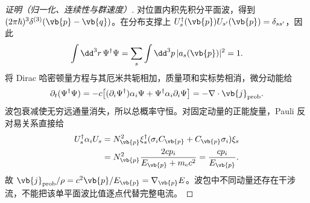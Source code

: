 \begin{proof}[证明（归一化、连续性与群速度）]
对位置内积先积分平面波，得到 $(2\pi\hbar)^3\delta^{(3)}(\vb{p}-\vb{q})$。在分布支撑上 $U_s^\dagger(\vb{p})U_{s'}(\vb{p})=\delta_{ss'}$，因此
\begin{equation*}
 \int\dd^3r\,\Psi^\dagger\Psi
 =\sum_s\int\dd^3p\,|a_s(\vb{p})|^2=1.
\end{equation*}
将 Dirac 哈密顿量方程与其厄米共轭相加，质量项和实标势相消，微分动能给
\begin{equation*}
 \partial_t(\Psi^\dagger\Psi)
 =-c\big[(\partial_i\Psi^\dagger)\alpha_i\Psi
 +\Psi^\dagger\alpha_i\partial_i\Psi\big]
 =-\nabla\cdot\vb{j}_{\rm prob}.
\end{equation*}
波包衰减使无穷远通量消失，所以总概率守恒。对固定动量的正能旋量，Pauli 反对易关系直接给
\begin{align*}
 U_s^\dagger\alpha_iU_s
 &=N_{\vb{p}}^2\xi_s^\dagger(\sigma_iC_{\vb{p}}+C_{\vb{p}}\sigma_i)\xi_s\\
 &=N_{\vb{p}}^2\frac{2cp_i}{E_{\vb{p}}+m_{\mathrm e}c^2}
 =\frac{cp_i}{E_{\vb{p}}}.
\end{align*}
故 $\vb{j}_{\rm prob}/\rho=c^2\vb{p}/E_{\vb{p}}=\nabla_{\vb{p}}E$。波包中不同动量还存在干涉流，不能把该单平面波比值逐点代替完整电流。
\end{proof}
